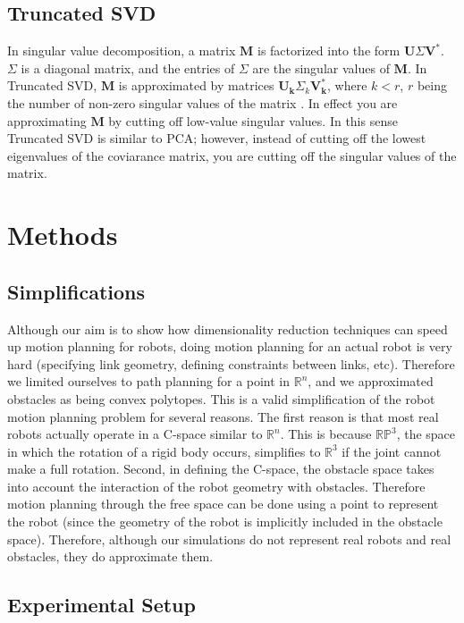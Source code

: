 \documentclass[12pt]{article}
\begin{document}
\subsection{Truncated SVD}

In singular value decomposition, a matrix $\mathbf{M}$ is factorized into the form $\mathbf{U} \Sigma \mathbf{V^*}$. $\Sigma$ is a diagonal matrix, and the entries of $\Sigma$ are the singular values of $\mathbf{M}$. In Truncated SVD, $\mathbf{M}$ is approximated by matrices $\mathbf{U_k} \Sigma_k \mathbf{V^*_k}$, where $ k < r $, $r$ being the number of non-zero singular values of the matrix \cite{maciejewski1989svd}. In effect you are approximating $\mathbf{M}$ by cutting off low-value singular values. In this sense Truncated SVD is similar to PCA; however, instead of cutting off the lowest eigenvalues of the coviarance matrix, you are cutting off the singular values of the matrix.

\section{Methods}

\subsection{Simplifications}

Although our aim is to show how dimensionality reduction techniques can speed
up motion planning for robots, doing motion planning for an actual robot is
very hard (specifying link geometry, defining constraints between links, etc).
Therefore we limited ourselves to path planning for a point in $\mathbb{R}^n$,
and we approximated obstacles as being convex polytopes. This is a valid
simplification of the robot motion planning problem for several reasons. The
first reason is that most real robots actually operate in a C-space similar to
$\mathbb{R}^n$. This is because $\mathbb{RP}^3$, the space in which the
rotation of a rigid body occurs, simplifies to $\mathbb{R}^3$ if the joint
cannot make a full rotation. Second, in defining the C-space, the obstacle
space takes into account the interaction of the robot geometry with obstacles.
Therefore motion planning through the free space can be done using a point to
represent the robot (since the geometry of the robot is implicitly included in
the obstacle space). Therefore, although our simulations do not represent real
robots and real obstacles, they do approximate them.

\subsection{Experimental Setup}
\end{document}
